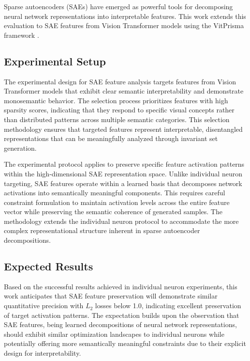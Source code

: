 Sparse autoencoders (SAEs) have emerged as powerful tools for decomposing neural network representations into interpretable features. This work extends this evaluation to SAE features from Vision Transformer models using the VitPrisma framework \citep{joseph2025prismaopensourcetoolkit}.

\subsection{Experimental Setup}

The experimental design for SAE feature analysis targets features from Vision Transformer models that exhibit clear semantic interpretability and demonstrate monosemantic behavior. The selection process prioritizes features with high sparsity scores, indicating that they respond to specific visual concepts rather than distributed patterns across multiple semantic categories. This selection methodology ensures that targeted features represent interpretable, disentangled representations that can be meaningfully analyzed through invariant set generation.

The experimental protocol applies \method{} to preserve specific feature activation patterns within the high-dimensional SAE representation space. Unlike individual neuron targeting, SAE features operate within a learned basis that decomposes network activations into semantically meaningful components. This requires careful constraint formulation to maintain activation levels across the entire feature vector while preserving the semantic coherence of generated samples. The methodology extends the individual neuron protocol to accommodate the more complex representational structure inherent in sparse autoencoder decompositions.

\subsection{Expected Results}

Based on the successful results achieved in individual neuron experiments, this work anticipates that SAE feature preservation will demonstrate similar quantitative precision with $L_2$ losses below 1.0, indicating excellent preservation of target activation patterns. The expectation builds upon the observation that SAE features, being learned decompositions of neural network representations, should exhibit similar optimization landscapes to individual neurons while potentially offering more semantically meaningful constraints due to their explicit design for interpretability.

